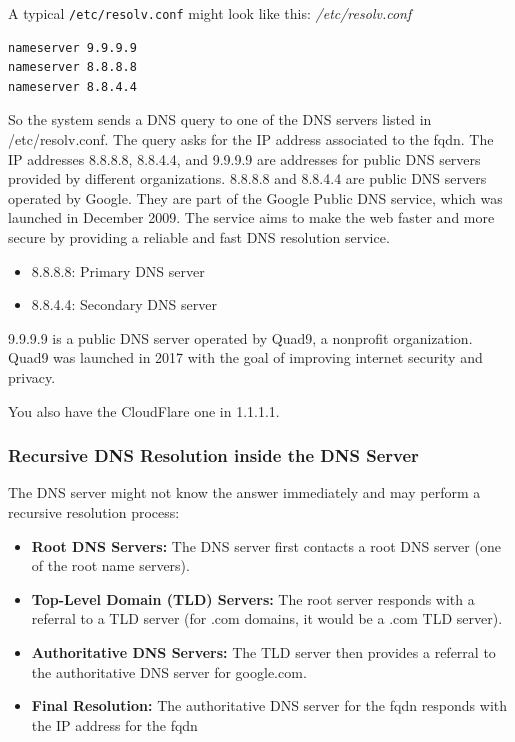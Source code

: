 \documentclass{article}
\newenvironment{blocktemplateII}[1]{%
    \tcolorbox[beamer,%
    noparskip,breakable,
    colframe=Green,%
    colbacklower=LimeGreen!75!LightGreen,%
    title=#1]}%
    {\endtcolorbox}
\newenvironment{codetemplate}[1][]{%
  \mybasecolorbox[#1]
  \itshape
}{%
  \endmybasecolorbox
}
\begin{document}
A typical \verb+/etc/resolv.conf+ might look like this:
\begin{codetemplate}{/etc/resolv.conf}
\begin{verbatim}
nameserver 9.9.9.9
nameserver 8.8.8.8
nameserver 8.8.4.4
\end{verbatim}
\end{codetemplate}

So the system sends a DNS query to one of the DNS servers listed in /etc/resolv.conf. The query asks for the IP address associated to the fqdn.
\begin{blocktemplateII}{Note}
The IP addresses 8.8.8.8, 8.8.4.4, and 9.9.9.9 are addresses for public DNS servers provided by different organizations. 8.8.8.8 and 8.8.4.4 are public DNS servers operated by Google. They are part of the Google Public DNS service, which was launched in December 2009. The service aims to make the web faster and more secure by providing a reliable and fast DNS resolution service.
\begin{itemize}
    \item 8.8.8.8: Primary DNS server
    \item 8.8.4.4: Secondary DNS server
\end{itemize}

9.9.9.9  is a public DNS server operated by Quad9, a nonprofit organization. Quad9 was launched in 2017 with the goal of improving internet security and privacy.

You also have the CloudFlare one in 1.1.1.1.
\end{blocktemplateII}

\subsubsection{Recursive DNS Resolution inside the DNS Server}
The DNS server might not know the answer immediately and may perform a recursive resolution process:

\begin{itemize}
    \item \textbf{Root DNS Servers:} The DNS server first contacts a root DNS server (one of the root name servers).
    \item \textbf{Top-Level Domain (TLD) Servers:} The root server responds with a referral to a TLD server (for .com domains, it would be a .com TLD server).
    \item \textbf{Authoritative DNS Servers:} The TLD server then provides a referral to the authoritative DNS server for google.com.
    \item \textbf{Final Resolution:} The authoritative DNS server for the fqdn responds with the IP address for the fqdn    
\end{itemize}
\end{document}
